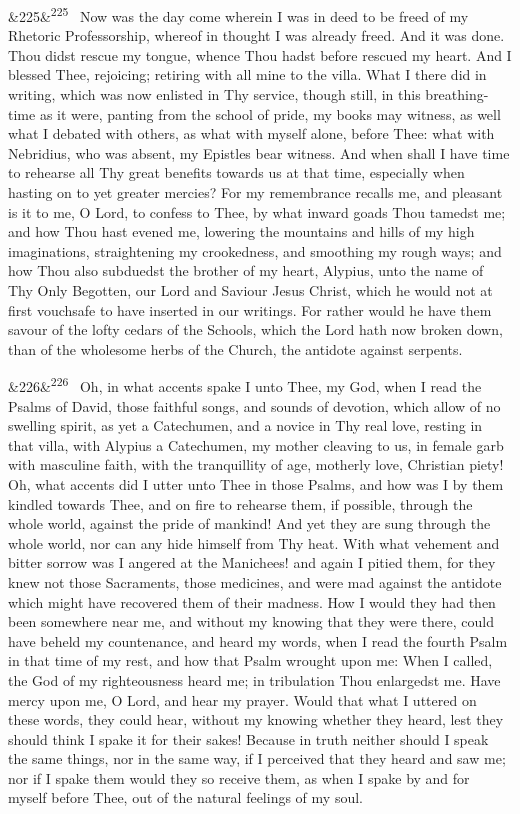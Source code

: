 \documentclass[12pt]{article}
\newcommand{\para}[1][]{\par\noindent\ifx&#1&\else\textsuperscript{\footnotesize #1}~\fi}
\begin{document}
\para[225] Now was the day come wherein I was in deed to be freed of my Rhetoric Professorship, whereof in thought I was already freed. And it was done. Thou didst rescue my tongue, whence Thou hadst before rescued my heart. And I blessed Thee, rejoicing; retiring with all mine to the villa. What I there did in writing, which was now enlisted in Thy service, though still, in this breathing-time as it were, panting from the school of pride, my books may witness, as well what I debated with others, as what with myself alone, before Thee: what with Nebridius, who was absent, my Epistles bear witness. And when shall I have time to rehearse all Thy great benefits towards us at that time, especially when hasting on to yet greater mercies? For my remembrance recalls me, and pleasant is it to me, O Lord, to confess to Thee, by what inward goads Thou tamedst me; and how Thou hast evened me, lowering the mountains and hills of my high imaginations, straightening my crookedness, and smoothing my rough ways; and how Thou also subduedst the brother of my heart, Alypius, unto the name of Thy Only Begotten, our Lord and Saviour Jesus Christ, which he would not at first vouchsafe to have inserted in our writings. For rather would he have them savour of the lofty cedars of the Schools, which the Lord hath now broken down, than of the wholesome herbs of the Church, the antidote against serpents.

\para[226] Oh, in what accents spake I unto Thee, my God, when I read the Psalms of David, those faithful songs, and sounds of devotion, which allow of no swelling spirit, as yet a Catechumen, and a novice in Thy real love, resting in that villa, with Alypius a Catechumen, my mother cleaving to us, in female garb with masculine faith, with the tranquillity of age, motherly love, Christian piety! Oh, what accents did I utter unto Thee in those Psalms, and how was I by them kindled towards Thee, and on fire to rehearse them, if possible, through the whole world, against the pride of mankind! And yet they are sung through the whole world, nor can any hide himself from Thy heat. With what vehement and bitter sorrow was I angered at the Manichees! and again I pitied them, for they knew not those Sacraments, those medicines, and were mad against the antidote which might have recovered them of their madness. How I would they had then been somewhere near me, and without my knowing that they were there, could have beheld my countenance, and heard my words, when I read the fourth Psalm in that time of my rest, and how that Psalm wrought upon me: When I called, the God of my righteousness heard me; in tribulation Thou enlargedst me. Have mercy upon me, O Lord, and hear my prayer. Would that what I uttered on these words, they could hear, without my knowing whether they heard, lest they should think I spake it for their sakes! Because in truth neither should I speak the same things, nor in the same way, if I perceived that they heard and saw me; nor if I spake them would they so receive them, as when I spake by and for myself before Thee, out of the natural feelings of my soul.
\end{document}
